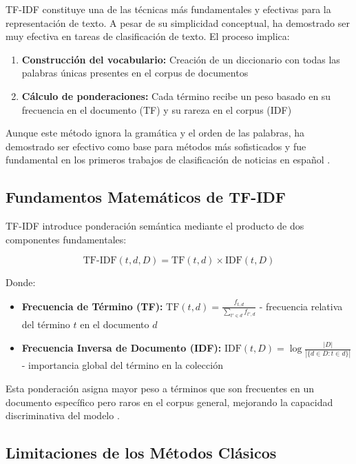TF-IDF constituye una de las técnicas más fundamentales y efectivas para la representación de texto. A pesar de su simplicidad conceptual, ha demostrado ser muy efectiva en tareas de clasificación de texto. El proceso implica:

\begin{enumerate}
    \item \textbf{Construcción del vocabulario:} Creación de un diccionario con todas las palabras únicas presentes en el corpus de documentos
    \item \textbf{Cálculo de ponderaciones:} Cada término recibe un peso basado en su frecuencia en el documento (TF) y su rareza en el corpus (IDF)
\end{enumerate}

Aunque este método ignora la gramática y el orden de las palabras, ha demostrado ser efectivo como base para métodos más sofisticados y fue fundamental en los primeros trabajos de clasificación de noticias en español \cite{acosta2019construccion}.

\subsection{Fundamentos Matemáticos de TF-IDF}

TF-IDF introduce ponderación semántica mediante el producto de dos componentes fundamentales:

\begin{equation}
\text{TF-IDF}(t,d,D) = \text{TF}(t,d) \times \text{IDF}(t,D)
\end{equation}

Donde:
\begin{itemize}
    \item \textbf{Frecuencia de Término (TF):} $\text{TF}(t,d) = \frac{f_{t,d}}{\sum_{t' \in d} f_{t',d}}$ - frecuencia relativa del término $t$ en el documento $d$
    \item \textbf{Frecuencia Inversa de Documento (IDF):} $\text{IDF}(t,D) = \log\frac{|D|}{|\{d \in D : t \in d\}|}$ - importancia global del término en la colección
\end{itemize}

Esta ponderación asigna mayor peso a términos que son frecuentes en un documento específico pero raros en el corpus general, mejorando la capacidad discriminativa del modelo \cite{thota2018fake}.

\subsection{Limitaciones de los Métodos Clásicos}


